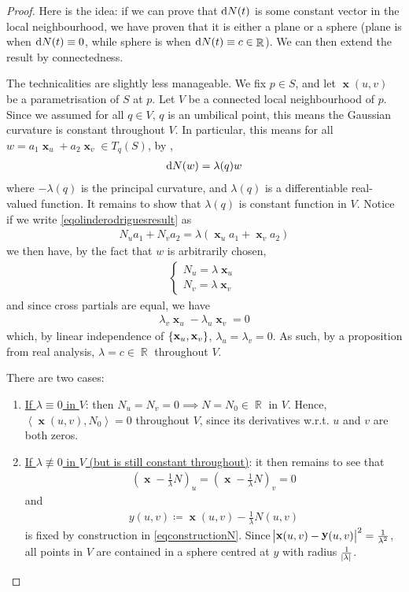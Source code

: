 \documentclass{amsart} %
\theoremstyle{mytheoremstyle}
\theoremstyle{definition}
\numberwithin{equation}{section}
\DeclareMathOperator{\R}{\mathbb{R}}
\DeclareMathOperator{\1}{\mathbbm{1}}
\DeclareMathOperator{\D}{\dif}
\DeclareMathOperator{\x}{\mathbf{x}}
\DeclareMathOperator{\y}{\mathbf{y}}
\newcommand{\innerproduct}[2]{\left\langle #1,#2 \right\rangle}
\begin{document}
\begin{proof}
	Here is the idea: if we can prove that $\D N(t)$ is some constant vector in the local neighbourhood, we have proven that it is either a plane or a sphere (plane is when $\D N(t) \equiv 0$, while sphere is when $\D N(t) \equiv c \in \R$). We can then extend the result by connectedness.
	
	The technicalities are slightly less manageable. We fix $p \in S$, and let $\x(u,v)$ be a parametrisation of $S$ at $p$. Let $V$ be a connected local neighbourhood of $p$. Since we assumed for all $q \in V$, $q$ is an umbilical point, this means the Gaussian curvature is constant throughout $V$. In particular, this means for all $w = a_1 \x_u + a_2 \x_v \in T_q (S)$, by ,
	\begin{align}
	\label{eqolinderodriguesresult}
	\D N(w)  = \lambda(q) w
	\end{align}
	where $-\lambda(q)$ is the principal curvature, and $\lambda(q)$ is a differentiable real-valued function. It remains to show that $\lambda(q)$ is constant function in $V$. Notice if we write \eqref{eqolinderodriguesresult} as
	\begin{align*}
	N_u a_1 + N_v a_2 = \lambda(\x_u a_1 + \x_v a_2)
	\end{align*}
	we then have, by the fact that $w$ is arbitrarily chosen,
	\begin{align}
	\label{eqconstructionN}
	\begin{cases*}
	N_u = \lambda \x_u \\
	N_v = \lambda \x_v
	\end{cases*}
	\end{align}
	and since cross partials are equal, we have
	\begin{align*}
	\lambda_v \x_u - \lambda_u \x_v = 0
	\end{align*}
	which, by linear independence of $\set{\x_u,\x_v}$, $\lambda_u = \lambda_v = 0$. As such, by a proposition from real analysis, $\lambda = c \in \R$ throughout $V$.
	
	There are two cases:
	\begin{enumerate}
		\item \uline{If $\lambda \equiv 0$ in $V$}: then $N_u = N_v = 0 \implies N = N_0 \in \R$ in $V$. Hence, $\innerproduct{\x(u,v)}{N_0} = 0$ throughout $V$, since its derivatives w.r.t. $u$ and $v$ are both zeros.
		
		\item \uline{If $\lambda \not\equiv 0$ in $V$ (but is still constant throughout)}: it then remains to see that
		\begin{align*}
		\left( \x - \frac{1}{\lambda} N \right)_u = \left( \x - \frac{1}{\lambda} N \right)_v = 0
		\end{align*}
		and
		\begin{align}
		\label{eqconstructiony}
			y(u,v) \coloneqq \x(u,v) - \frac{1}{\lambda} N(u,v)
		\end{align}
		is fixed by construction in \eqref{eqconstructionN}. Since $\abs{\x(u,v) - \y(u,v)}^2 = \frac{1}{\lambda^2}$, all points in $V$ are contained in a sphere centred at $y$ with radius $\frac{1}{\abs{\lambda}}$.
	\end{enumerate}
	

\end{proof}
\end{document}
